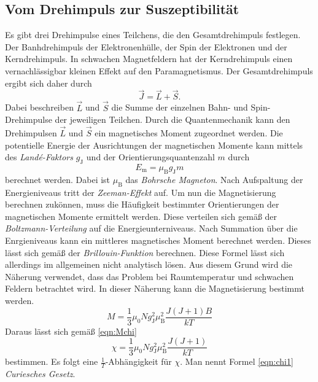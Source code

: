 \subsection{Vom Drehimpuls zur Suszeptibilität}
\label{subsec:drehsus}
Es gibt drei Drehimpulse eines Teilchens, die den Gesamtdrehimpuls festlegen. Der Banhdrehimpuls der Elektronenhülle, der Spin der Elektronen und der Kerndrehimpuls. In schwachen 
Magnetfeldern hat der Kerndrehimpuls einen vernachlässigbar kleinen Effekt auf den Paramagnetismus. Der Gesamtdrehimpuls ergibt sich daher durch 
\begin{equation*}
    \vec{J} = \vec{L} + \vec{S}.
\end{equation*}
Dabei beschreiben $\vec{L}$ und $\vec{S}$ die Summe der einzelnen Bahn- und Spin- Drehimpulse der jeweiligen Teilchen. Durch die Quantenmechanik kann den Drehimpulsen 
$\vec{L}$ und $\vec{S}$
ein magnetisches Moment zugeordnet werden. 
Die potentielle Energie der Ausrichtungen der magnetischen Momente kann mittels des \textit{Landé-Faktors} $g_{\text{J}}$ und der Orientierungsquantenzahl $m$ durch 
\begin{equation}
    E_{\text{m}} = \mu_{\text{B}} g_{\text{J}} m
\end{equation} 
berechnet werden. Dabei ist $\mu_{\text{B}}$ das \textit{Bohrsche Magneton}. Nach Aufspaltung der Energieniveaus tritt der \textit{Zeeman-Effekt} auf. Um nun die Magnetisierung
berechnen zukönnen, muss die Häufigkeit bestimmter Orientierungen der magnetischen Momente ermittelt werden. Diese verteilen sich gemäß der \textit{Boltzmann-Verteilung}
auf die  Energieunterniveaus. Nach Summation über die Enrgieniveaus kann ein mittleres magnetisches Moment berechnet werden. Dieses lässt sich gemäß der \textit{Brillouin-Funktion}
berechnen. Diese Formel lässt sich allerdings im allgemeinen nicht analytisch lösen. 
Aus diesem Grund wird die Näherung verwendet, dass das Problem bei Raumtemperatur und schwachen Feldern betrachtet wird.
In dieser Näherung kann die Magnetisierung bestimmt werden.
\begin{equation*}
    M = \frac{1}{3}\mu_0 N g^2_{\text{J}} \mu^2_{\text{B}} \frac{J(J+1)B}{kT}
\end{equation*}
Daraus lässt sich gemäß \autoref{eqn:Mchi}
\begin{equation}
    \label{eqn:chi1}
    \chi = \frac{1}{3}\mu_0 N g^2_{\text{J}} \mu^2_{\text{B}} \frac{J(J+1)}{kT}
\end{equation}  
bestimmen.
Es folgt eine $\frac{1}{T}$-Abhängigkeit für $\chi$. Man nennt Formel \eqref{eqn:chi1} \textit{Curiesches Gesetz}.

